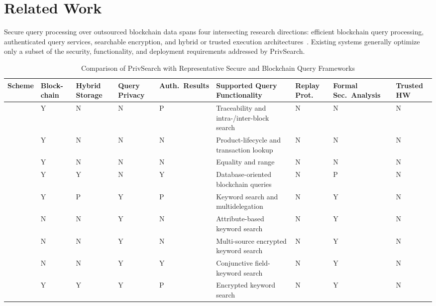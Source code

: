 \section{Related Work}
\label{sec:related}

Secure query processing over outsourced blockchain data spans four intersecting research directions: efficient blockchain query processing, authenticated query services, searchable encryption, and hybrid or trusted execution architectures~\cite{ChenAilin}. Existing systems generally optimize only a subset of the security, functionality, and deployment requirements addressed by PrivSearch.

\begin{table}[t]
\centering
\caption{Comparison of PrivSearch with Representative Secure and Blockchain Query Frameworks}
\label{tab:related_comparison}
\scriptsize
\setlength{\tabcolsep}{3pt}
\begin{tabular}{@{}p{1.5cm}>{\centering\arraybackslash}p{1.0cm}>{\centering\arraybackslash}p{1.1cm}>{\centering\arraybackslash}p{1.05cm}>{\centering\arraybackslash}p{1.15cm}p{4.6cm}>{\centering\arraybackslash}p{1.1cm}>{\centering\arraybackslash}p{1.15cm}>{\centering\arraybackslash}p{1.15cm}@{}}
\toprule
\textbf{Scheme} & \textbf{Block-chain} & \textbf{Hybrid Storage} & \textbf{Query Privacy} & \textbf{Auth.\ Results} & \textbf{Supported Query Functionality} & \textbf{Replay Prot.} & \textbf{Formal Sec.\ Analysis} & \textbf{Trusted HW} \\
\midrule
\cite{Lai}  & Y & N & N & P & Traceability and intra-/inter-block search & N & N & N \\
\cite{Hu} & Y & N & N & N & Product-lifecycle and transaction lookup & N & N & N \\
\cite{Lee} & Y & N & N & N & Equality and range & N & N & N \\
\cite{WuHaotianPeng} & Y & Y & N & Y & Database-oriented blockchain queries & N & P & N \\
\cite{LeeJoonYoung} & Y & P & Y & P & Keyword search and multidelegation & N & Y & N \\
\cite{Zhang} & N & N & Y & N & Attribute-based keyword search & N & Y & N \\
\cite{Yao} & N & N & Y & N & Multi-source encrypted keyword search & N & Y & N \\
\cite{Lu} & N & N & Y & Y & Conjunctive field-keyword search & N & Y & N \\
\cite{Li}  & Y & Y & Y & P & Encrypted keyword search & N & Y & N \\

\end{tabular}
\end{table}
